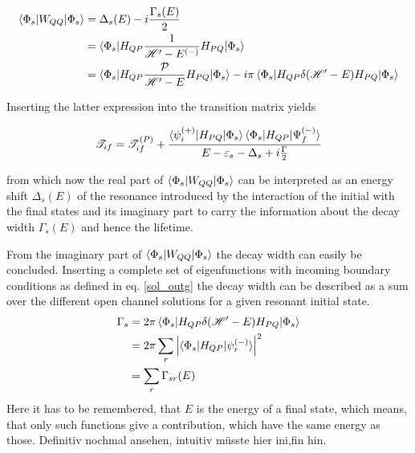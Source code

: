 \begin{align}
  \braket{\Phi_s|W_{QQ}|\Phi_s} & = \Delta_s(E) - i \frac{\Gamma_s(E)}{2}\\
                                & = \braket{\Phi_s|H_{QP}
                                    \frac{1}{\mathscr{H}' - E^{(-)}}H_{PQ}|\Phi_s}\\
                                & = \braket{\Phi_s|H_{QP}
                                    \frac{\mathcal{P}}{\mathscr{H}' - E}H_{PQ}|\Phi_s}
                                    - i\pi \braket{\Phi_s|H_{QP}\delta(\mathscr{H}'-E)H_{PQ}
                                    |\Phi_s} 
\end{align}

Inserting the latter expression into the transition matrix yields

\begin{equation}
  \mathscr{T}_{if} = \mathscr{T}_{if}^{(P)} + 
                     \frac{\braket{\psi_i^{(+)}|H_{PQ}|\Phi_s}
                           \braket{\Phi_s|H_{QP}|\Psi_f^{(-)}}}
                          {E-\varepsilon_s - \Delta_s + i \frac{\Gamma}{2}}
\end{equation}

from which now the real part of $\braket{\Phi_s|W_{QQ}|\Phi_s}$ can be interpreted 
as an energy shift $\Delta_s(E)$ of the resonance introduced by the interaction of the initial
with the final states and its imaginary part to carry the information about the
decay width $\Gamma_s(E)$ and hence the lifetime.


From the imaginary part of $\braket{\Phi_s|W_{QQ}|\Phi_s}$ the decay width can
easily be concluded. Inserting a complete set
of eigenfunctions with incoming boundary conditions as defined in
eq. \ref{sol_outg} the decay width can be described
as a sum over the different open channel solutions for a given resonant initial state.
\begin{align}
  \Gamma_s & = 2 \pi \braket{\Phi_s|H_{QP}\delta(\mathscr{H}'-E)H_{PQ}|\Phi_s}   \label{equation:Gamma_HE}\\
           & = 2 \pi \sum\limits_r \left | \braket{\Phi_s|H_{QP}|\psi_r^{(-)}} \right|^2
                \\
           & = \sum\limits_r \Gamma_{sr}(E)
\end{align}
Here it has to be remembered, that $E$ is the energy of a final state, which means, that
only such functions give a contribution, which have the same energy as those.
Definitiv nochmal ansehen, intuitiv müsste hier ini,fin hin.

